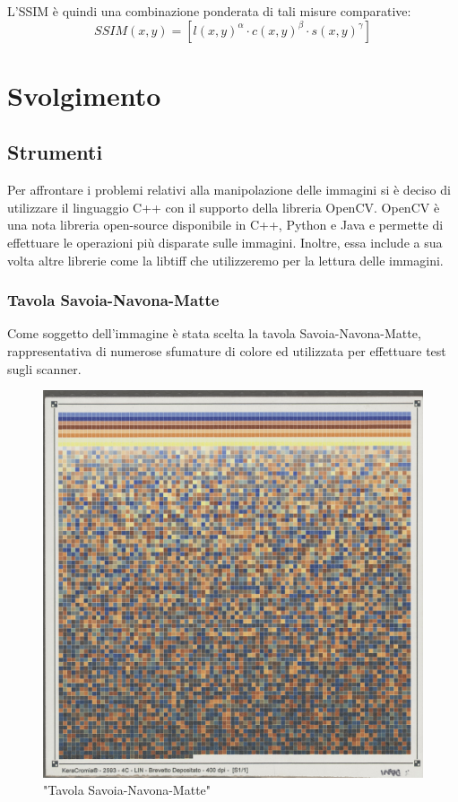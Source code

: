 \documentclass[a4paper,11pt]{article}
\begin{document}
    L'SSIM è quindi una combinazione ponderata di tali misure comparative:
    $$SSIM(x,y) = [l(x,y)^\alpha \cdot c(x,y)^\beta \cdot s(x,y)^\gamma]$$
    
    \newpage

    \section{Svolgimento}

    \subsection{Strumenti}
    Per affrontare i problemi relativi alla manipolazione delle immagini si è deciso di utilizzare il linguaggio C++ con il supporto della libreria OpenCV.
    OpenCV è una nota libreria open-source disponibile in C++, Python e Java e permette di effettuare le operazioni più disparate sulle immagini.
    Inoltre, essa include a sua volta altre librerie come la libtiff che utilizzeremo per la lettura delle immagini.
    
    \subsubsection{Tavola Savoia-Navona-Matte}
    Come soggetto dell'immagine è stata scelta la tavola Savoia-Navona-Matte, rappresentativa di numerose sfumature di colore ed utilizzata per effettuare test sugli scanner.

    \begin{figure}[h]
        \centering
        \includegraphics[scale=0.4]{tavola}
        \caption{"Tavola Savoia-Navona-Matte"}
    \end{figure}
\end{document}
